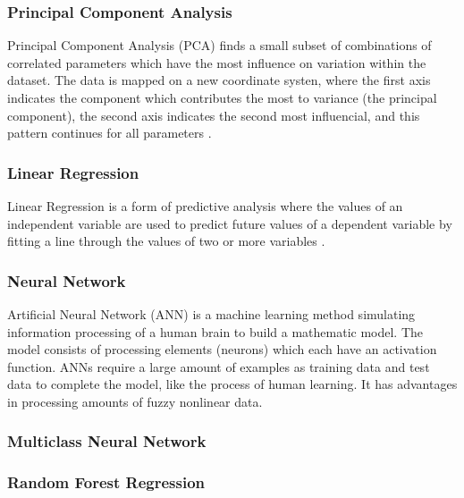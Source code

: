 \documentclass[a4paper,titlepage]{article}
\begin{document}
\subsubsection*{Principal Component Analysis}
Principal Component Analysis (PCA) finds a small subset of combinations of correlated parameters which have the most influence on variation within the dataset.
The data is mapped on a new coordinate systen, where the first axis indicates the component which contributes the most to variance (the principal component), the second axis indicates the second most influencial, and this pattern continues for all parameters \cite{einasto2011}. 
\subsubsection*{Linear Regression}
Linear Regression is a form of predictive analysis where the values of an independent variable are used to predict future values of a dependent variable by fitting a line through the values of two or more variables \cite{davison2003}.
\subsubsection*{Neural Network}
Artificial Neural Network (ANN) is a machine learning method simulating information processing of a human brain to build a mathematic model. 
The model consists of processing elements (neurons) which each have an activation function. 
ANNs require a large amount of examples as training data and test data to complete the model, like the process of human learning. 
It has advantages in processing amounts of fuzzy nonlinear data.
\subsubsection*{Multiclass Neural Network}
\subsubsection*{Random Forest Regression}
\end{document}
